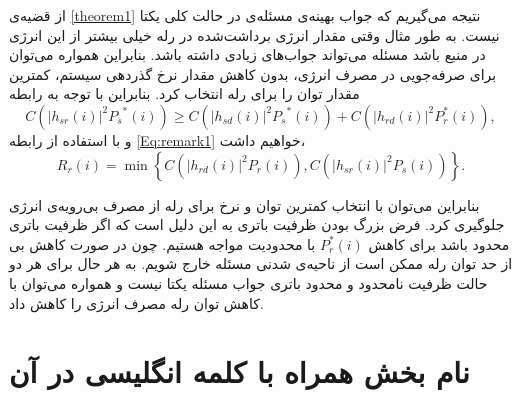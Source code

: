 \begin{remark}
از قضیه‌ی
\ref{theorem1}
نتیجه می‌گیریم که جواب بهینه‌ی مسئله‌ی
در حالت کلی یکتا نیست. به طور مثال وقتی مقدار انرژی برداشت‌شده در رله خیلی بیشتر از این انرژی در منبع باشد مسئله می‌تواند جواب‌های زیادی داشته باشد. بنابراین همواره می‌توان برای صرفه‌جویی در مصرف انرژی، بدون کاهش مقدار نرخ گذردهی سیستم، کمترین مقدار توان را برای رله انتخاب کرد. بنابراین با توجه به رابطه
\begin{equation}
C\left( {{{\left| {{h_{sr}}\left( i \right)} \right|}^2}{P_s}^*\left( i \right)} \right) 
\ge C\left( {{{\left| {{h_{sd}}\left( i \right)} \right|}^2}{P_s}^*\left( i \right)} \right) + C\left( {{{\left| {{h_{rd}}\left( {i} \right)} \right|}^2}P_r^*\left( {i} \right)} \right),
\label{Eq:remark1}
\end{equation}
و با  استفاده از رابطه
\ref{Eq:remark1}
خواهیم داشت،
\begin{equation}
{R_r}(i) = \min \left\{ {C\left( {{{\left| {{h_{rd}}(i)} \right|}^2}{P_r}(i)} \right),C\left( {{{\left| {{h_{sr}}(i)} \right|}^2}{P_s}(i)} \right)} \right\}.
\end{equation}

بنابراین می‌توان با انتخاب کمترین توان و نرخ برای رله از مصرف بی‌رویه‌ی انرژی جلوگیری کرد. فرض بزرگ بودن ظرفیت باتری‌ به این دلیل است که اگر ظرفیت باتری محدود باشد برای کاهش
$P_r^*(i)$
با محدودیت مواجه هستیم. چون در صورت کاهش بی از حد توان رله ممکن است از ناحیه‌ی شدنی مسئله خارج شویم. به هر حال برای هر دو حالت ظرفیت نامحدود و محدود باتری جواب مسئله یکتا نیست و همواره می‌توان با کاهش توان رله مصرف انرژی را کاهش داد.
\end{remark}

\section{نام بخش همراه با کلمه انگلیسی
  در آن}




